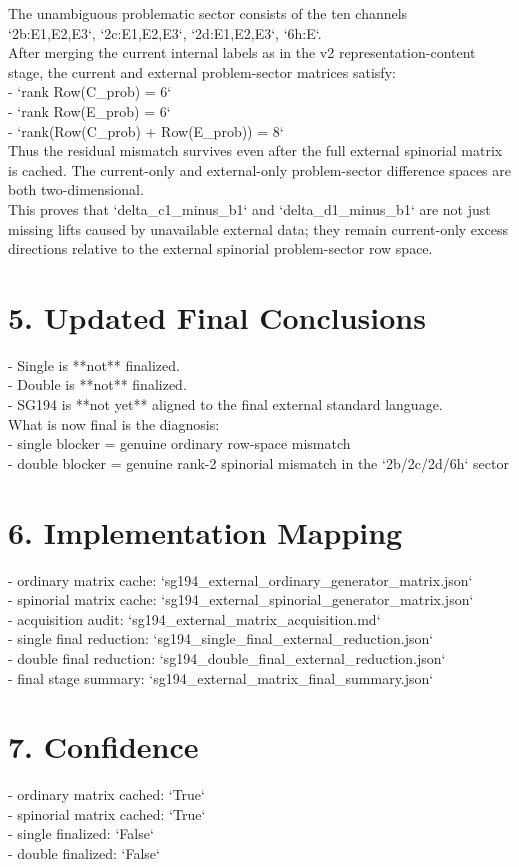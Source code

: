 \documentclass[11pt]{article}
\begin{document}
The unambiguous problematic sector consists of the ten channels\\
`2b:E1,E2,E3`, `2c:E1,E2,E3`, `2d:E1,E2,E3`, `6h:E`.\\
After merging the current internal labels as in the v2 representation-content stage, the current and external problem-sector matrices satisfy:\\

- `rank Row(C\_prob) = 6`\\
- `rank Row(E\_prob) = 6`\\
- `rank(Row(C\_prob) + Row(E\_prob)) = 8`\\

Thus the residual mismatch survives even after the full external spinorial matrix is cached. The current-only and external-only problem-sector difference spaces are both two-dimensional.\\

This proves that `delta\_c1\_minus\_b1` and `delta\_d1\_minus\_b1` are not just missing lifts caused by unavailable external data; they remain current-only excess directions relative to the external spinorial problem-sector row space.\\

\section*{5. Updated Final Conclusions}

- Single is **not** finalized.\\
- Double is **not** finalized.\\
- SG194 is **not yet** aligned to the final external standard language.\\

What is now final is the diagnosis:\\

- single blocker = genuine ordinary row-space mismatch\\
- double blocker = genuine rank-2 spinorial mismatch in the `2b/2c/2d/6h` sector\\

\section*{6. Implementation Mapping}

- ordinary matrix cache: `sg194\_external\_ordinary\_generator\_matrix.json`\\
- spinorial matrix cache: `sg194\_external\_spinorial\_generator\_matrix.json`\\
- acquisition audit: `sg194\_external\_matrix\_acquisition.md`\\
- single final reduction: `sg194\_single\_final\_external\_reduction.json`\\
- double final reduction: `sg194\_double\_final\_external\_reduction.json`\\
- final stage summary: `sg194\_external\_matrix\_final\_summary.json`\\

\section*{7. Confidence}

- ordinary matrix cached: `True`\\
- spinorial matrix cached: `True`\\
- single finalized: `False`\\
- double finalized: `False`\\
        
\end{document}

